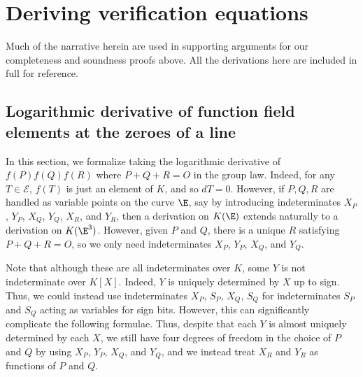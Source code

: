 \documentclass[11pt,letterpaper]{article}
\theoremstyle{definition}
\newcommand{\6}{\mathbf}
\newcommand{\7}{\mathcal}
\begin{document}
         




















\appendix

\section{Deriving verification equations}\label{sec:derivation}

Much of the narrative herein are used in supporting arguments for our completeness and soundness proofs above. All the derivations here are included in full for reference. 

\subsection{Logarithmic derivative of function field elements at the zeroes of a line}

In this section, we formalize taking the logarithmic derivative of $f(P)f(Q)f(R)$ where $P + Q + R = O$ in the group law. Indeed, for any $T \in \mathcal{E}$, $f(T)$ is just an element of $K$, and so $dT = 0$. However, if $P, Q, R$ are handled as variable points on the curve $\E$, say by introducing indeterminates $X_P$, $Y_P$, $X_Q$, $Y_Q$, $X_R$, and $Y_R$, then a derivation on $K(\E)$ extends naturally to a derivation on $K(\E^3)$. However, given $P$ and $Q$, there is a unique $R$ satisfying $P + Q + R = O$, so we only need indeterminates $X_P$, $Y_P$, $X_Q$, and $Y_Q$.

Note that although these are all indeterminates over $K$, some $Y$ is not indeterminate over $K[X]$. Indeed, $Y$ is uniquely determined by $X$ up to sign. Thus, we could instead use indeterminates $X_P$, $S_P$, $X_Q$, $S_Q$ for indeterminates $S_P$ and $S_Q$ acting as variables for sign bits. However, this can significantly complicate the following formulae. Thus, despite that each $Y$ is almost uniquely determined by each $X$, we still have four degrees of freedom in the choice of $P$ and $Q$ by using $X_P$, $Y_P$, $X_Q$, and $Y_Q$, and we instead treat $X_R$ and $Y_R$ as functions of $P$ and $Q$.
\end{document}
